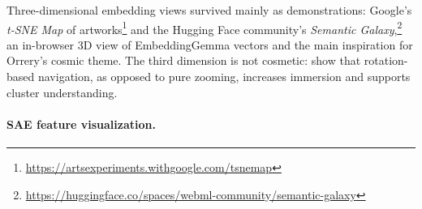 \documentclass[11pt]{article}
\begin{document}
Three-dimensional embedding views survived mainly as demonstrations: Google's \textit{t-SNE Map} of
artworks\footnote{\url{https://artsexperiments.withgoogle.com/tsnemap}} and the Hugging Face community's \textit{Semantic Galaxy},\footnote{\url{https://huggingface.co/spaces/webml-community/semantic-galaxy}}
an in-browser 3D view of EmbeddingGemma \cite{vera2025embeddinggemmapowerfullightweighttext} vectors and the main inspiration for Orrery's cosmic theme. The third dimension is not cosmetic: \citet{9222098} show that rotation-based navigation, as opposed to pure zooming, increases immersion and supports cluster understanding.   





\paragraph{SAE feature visualization.}


\end{document}
